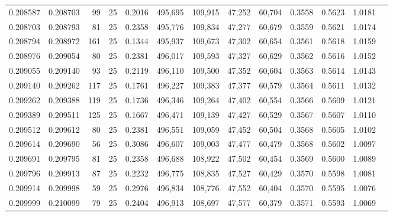 \begin{tabular}{rrrrrrrrrrrrr}
0.208587 & 0.208703 &    99 &  25 &                                     0.2016 & 495,695 & 109,915 &  47,252 &  60,704 & 0.3558 & 0.5623 & 1.0181 \\
0.208703 & 0.208793 &    81 &  25 &                                     0.2358 & 495,776 & 109,834 &  47,277 &  60,679 & 0.3559 & 0.5621 & 1.0174 \\
0.208794 & 0.208972 &   161 &  25 &                                     0.1344 & 495,937 & 109,673 &  47,302 &  60,654 & 0.3561 & 0.5618 & 1.0159 \\
0.208976 & 0.209054 &    80 &  25 &                                     0.2381 & 496,017 & 109,593 &  47,327 &  60,629 & 0.3562 & 0.5616 & 1.0152 \\
0.209055 & 0.209140 &    93 &  25 &                                     0.2119 & 496,110 & 109,500 &  47,352 &  60,604 & 0.3563 & 0.5614 & 1.0143 \\
0.209140 & 0.209262 &   117 &  25 &                                     0.1761 & 496,227 & 109,383 &  47,377 &  60,579 & 0.3564 & 0.5611 & 1.0132 \\
0.209262 & 0.209388 &   119 &  25 &                                     0.1736 & 496,346 & 109,264 &  47,402 &  60,554 & 0.3566 & 0.5609 & 1.0121 \\
0.209389 & 0.209511 &   125 &  25 &                                     0.1667 & 496,471 & 109,139 &  47,427 &  60,529 & 0.3567 & 0.5607 & 1.0110 \\
0.209512 & 0.209612 &    80 &  25 &                                     0.2381 & 496,551 & 109,059 &  47,452 &  60,504 & 0.3568 & 0.5605 & 1.0102 \\
0.209614 & 0.209690 &    56 &  25 &                                     0.3086 & 496,607 & 109,003 &  47,477 &  60,479 & 0.3568 & 0.5602 & 1.0097 \\
0.209691 & 0.209795 &    81 &  25 &                                     0.2358 & 496,688 & 108,922 &  47,502 &  60,454 & 0.3569 & 0.5600 & 1.0089 \\
0.209796 & 0.209913 &    87 &  25 &                                     0.2232 & 496,775 & 108,835 &  47,527 &  60,429 & 0.3570 & 0.5598 & 1.0081 \\
0.209914 & 0.209998 &    59 &  25 &                                     0.2976 & 496,834 & 108,776 &  47,552 &  60,404 & 0.3570 & 0.5595 & 1.0076 \\
0.209999 & 0.210099 &    79 &  25 &                                     0.2404 & 496,913 & 108,697 &  47,577 &  60,379 & 0.3571 & 0.5593 & 1.0069 \\

\end{tabular}
